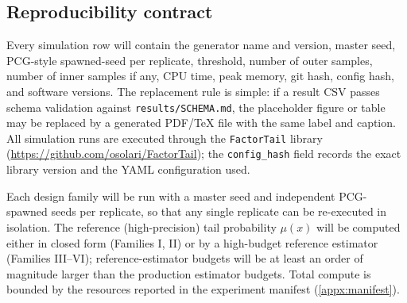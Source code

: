 \begin{table}[p]
\centering

\caption[Experiment status]{Experiment status. This is a project-management
artifact inside the paper: it marks each planned experiment, required data
product, expected figure/table outputs, and current completion status. The
column entries \emph{planned} and \emph{optional/planned} are real categorical
labels, not placeholders.}
\label{tab:experiment-status}
\end{table}

\subsection{Reproducibility contract}

Every simulation row will contain the generator name and version, master seed,
PCG-style spawned-seed per replicate, threshold, number of outer samples,
number of inner samples if any, CPU time, peak memory, git hash, config hash,
and software versions. The replacement rule is simple: if a result CSV passes
schema validation against \texttt{results/SCHEMA.md}, the placeholder figure
or table may be replaced by a generated PDF/TeX file with the same label and
caption. All simulation runs are executed through the \texttt{FactorTail}
library (\url{https://github.com/osolari/FactorTail}); the
\texttt{config\_hash} field records the exact library version and the YAML
configuration used.

\begin{remark}
\label{rem:sim-reproducibility}
Each design family will be run with a master seed and independent
PCG-spawned seeds per replicate, so that any single replicate can be
re-executed in isolation. The reference (high-precision) tail probability
$\mu(x)$ will be computed either in closed form (Families I, II) or by a
high-budget reference estimator (Families III--VI); reference-estimator
budgets will be at least an order of magnitude larger than the production
estimator budgets. Total compute is bounded by the resources reported in the
experiment manifest (\cref{appx:manifest}).
\end{remark}
